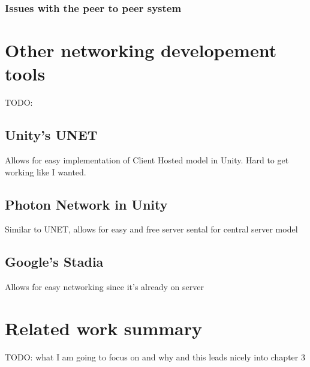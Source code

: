 \subsubsection{Issues with the peer to peer system}


\newpage
\section{Other networking developement tools}
TODO:

\subsection{Unity's UNET}
Allows for easy implementation of Client Hosted model in Unity. Hard to get working like I wanted.


\subsection{Photon Network in Unity}
Similar to UNET, allows for easy and free server sental for central server model


\subsection{Google's Stadia}
Allows for easy networking since it's already on server


\section{Related work summary}
TODO: what I am going to focus on and why and this leads nicely into chapter 3
